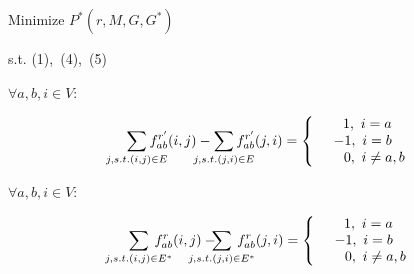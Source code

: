 \documentclass[conference]{IEEEtran}
\begin{document}
\begin{center}
Minimize \quad $P^*(r, M, G, G^*)$
\end{center}

\begin{center}
s.t. (1),\ (4),\ (5)
\end{center}

\begin{center}
    $\forall a,b,i \in V$: \quad \quad \quad \quad \quad \quad \quad \quad \quad \quad \quad \quad \quad \quad \quad
    \vspace{-0.3in}
\end{center}

\begin{equation}
    \begin{split}
    \sum_{j, s.t.(i,j) \in E}\hspace{-0.2in}f^{r'}_{ab}(i,j) - \hspace{-0.2in}\sum_{j, s.t.(j,i) \in E}\hspace{-0.2in}f^{r'}_{ab}(j,i) =
    \left\{
        \begin{array}{c}
        \ \ 1, \ i = a \\
        -1, \ i = b \\
        \ \ \ \ \ 0, \ i \neq a,b \\
        \end{array}
    \right.
    \end{split}
\end{equation}

\begin{center}
    \vspace{0.1in}
    $\forall a,b,i \in V$: \quad \quad \quad \quad \quad \quad \quad \quad \quad \quad \quad \quad \quad \quad \quad
    \vspace{-0.3in}
\end{center}

\begin{equation}
    \begin{split}
    \sum_{j, s.t.(i,j) \in E^*}\hspace{-0.2in}f^r_{ab}(i,j) - \hspace{-0.3in}\sum_{j, s.t.(j,i) \in E^*}\hspace{-0.2in}f^r_{ab}(j,i) =
    \left\{
        \begin{array}{c}
        \ \ 1, \ i = a \\
        -1, \ i = b \\
        \ \ \ \ \ 0, \ i \neq a,b \\
        \end{array}
    \right.
    \end{split}
\end{equation}
\end{document}
